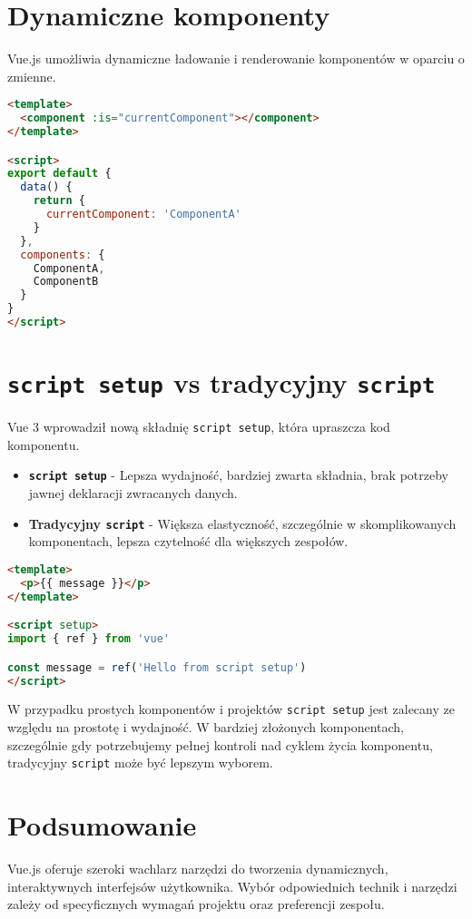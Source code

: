 \documentclass[a4paper,12pt]{article}
\begin{document}
\section{Dynamiczne komponenty}
Vue.js umożliwia dynamiczne ładowanie i renderowanie komponentów w oparciu o zmienne.

\begin{lstlisting}[language=HTML, caption=Przykład dynamicznych komponentów]
<template>
  <component :is="currentComponent"></component>
</template>

<script>
export default {
  data() {
    return {
      currentComponent: 'ComponentA'
    }
  },
  components: {
    ComponentA,
    ComponentB
  }
}
</script>
\end{lstlisting}

\section{\texttt{script setup} vs tradycyjny \texttt{script}}
Vue 3 wprowadził nową składnię \texttt{script setup}, która upraszcza kod komponentu.

\begin{itemize}
    \item \textbf{\texttt{script setup}} - Lepsza wydajność, bardziej zwarta składnia, brak potrzeby jawnej deklaracji zwracanych danych.
    \item \textbf{Tradycyjny \texttt{script}} - Większa elastyczność, szczególnie w skomplikowanych komponentach, lepsza czytelność dla większych zespołów.
\end{itemize}

\begin{lstlisting}[language=HTML, caption=Przykład użycia \texttt{script setup}]
<template>
  <p>{{ message }}</p>
</template>

<script setup>
import { ref } from 'vue'

const message = ref('Hello from script setup')
</script>
\end{lstlisting}

W przypadku prostych komponentów i projektów \texttt{script setup} jest zalecany ze względu na prostotę i wydajność. W bardziej złożonych komponentach, szczególnie gdy potrzebujemy pełnej kontroli nad cyklem życia komponentu, tradycyjny \texttt{script} może być lepszym wyborem.

\section{Podsumowanie}
Vue.js oferuje szeroki wachlarz narzędzi do tworzenia dynamicznych, interaktywnych interfejsów użytkownika. Wybór odpowiednich technik i narzędzi zależy od specyficznych wymagań projektu oraz preferencji zespołu.
\end{document}
